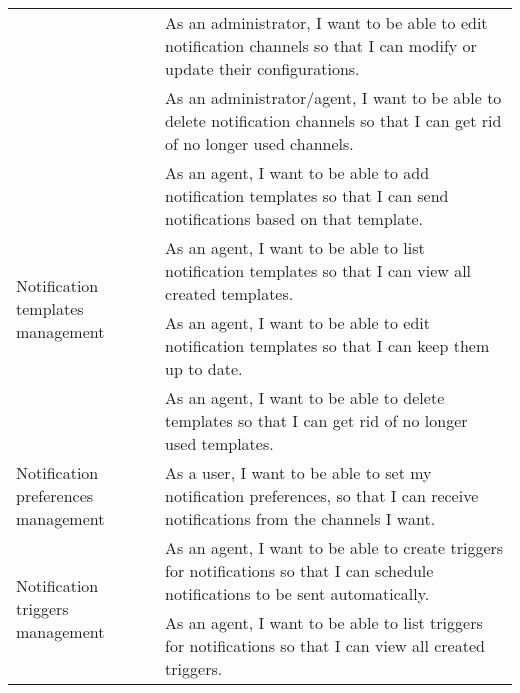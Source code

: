 \begin{longtable}{ | m{}  | m{} | }
      \cline{2-2}
                                                              & As an administrator, I want to be able to edit notification channels so that I can modify or update their configurations.                                             \\
      \cline{2-2}
                                                              & As an administrator/agent, I want to be able to delete notification channels so that I can get rid of no longer used channels.                                        \\
      \hline
      \multirow[t]{4}{5em}{Notification templates management} & As an agent, I want to be able to add notification templates so that I can send notifications based on that template.                                                 \\
      \cline{2-2}
                                                              & As an agent, I want to be able to list notification templates so that I can view all created templates.                                                               \\
      \cline{2-2}
                                                              & As an agent, I want to be able to edit notification templates so that I can keep them up to date.                                                                     \\
      \cline{2-2}
                                                              & As an agent, I want to be able to delete templates so that I can get rid of no longer used templates.                                                                 \\
      \hline
      Notification preferences management                     & As a user, I want to be able to set my notification preferences, so that I can receive notifications from the channels I want.                                        \\
      \hline
      \multirow[t]{4}{5em}{Notification triggers management}  & As an agent, I want to be able to create triggers for notifications so that I can schedule notifications to be sent automatically.                                    \\
      \cline{2-2}
                                                              & As an agent, I want to be able to list triggers for notifications so that I can view all created triggers.                                                            \\

\end{longtable}
